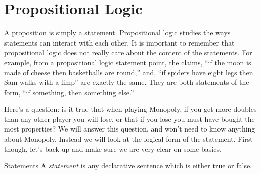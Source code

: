 \documentclass[12pt]{article}
\begin{document}
\section{Propositional Logic}




A proposition is simply a statement.  Propositional logic studies the ways statements can interact with each other.  It is important to remember that propositional logic does not really care about the content of the statements.  For example, from a propositional logic statement point, the claims, ``if the moon is made of cheese then basketballs are round,'' and, ``if spiders have eight legs then Sam walks with a limp'' are exactly the same.  They are both statements of the form, ``if \textlangle something\textrangle, then \textlangle something else\textrangle.''

Here's a question: is it true that when playing Monopoly, if you get more doubles than any other player you will lose, or that if you lose you must have bought the most properties?  We will answer this question, and won't need to know anything about Monopoly.  Instead we will look at the logical form of the statement.  First though, let's back up and make sure we are very clear on some basics.

\begin{defbox}{Statements}
	A \emph{statement} is any declarative sentence which is either true or false.
\end{defbox}
\end{document}
